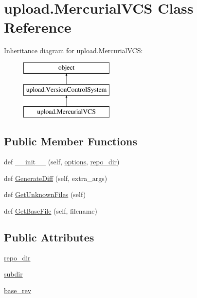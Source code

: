 \hypertarget{classupload_1_1_mercurial_v_c_s}{}\section{upload.\+Mercurial\+V\+C\+S Class Reference}
\label{classupload_1_1_mercurial_v_c_s}
Inheritance diagram for upload.\+Mercurial\+V\+C\+S\+:\begin{figure}[H]
\begin{center}
\leavevmode
\includegraphics[height=3.000000cm]{classupload_1_1_mercurial_v_c_s}
\end{center}
\end{figure}
\subsection*{Public Member Functions}
\begin{DoxyCompactItemize}
\item 
def \hyperlink{classupload_1_1_mercurial_v_c_s_a33890f442dedbb7d9fd45c08b5baed56}{\+\_\+\+\_\+init\+\_\+\+\_\+} (self, \hyperlink{classupload_1_1_version_control_system_a4d57d043bc408887b94269fe4cea9556}{options}, \hyperlink{classupload_1_1_mercurial_v_c_s_a219c1e0ab9ce864e3231913762ea489b}{repo\+\_\+dir})
\item 
def \hyperlink{classupload_1_1_mercurial_v_c_s_a6c05746012d8cd435c94ace1465671ef}{Generate\+Diff} (self, extra\+\_\+args)
\item 
def \hyperlink{classupload_1_1_mercurial_v_c_s_a6190899fb86cd09ad84cc5d4b0ebd2f3}{Get\+Unknown\+Files} (self)
\item 
def \hyperlink{classupload_1_1_mercurial_v_c_s_a0cdc0cbe6ac4daab82f5f01e6ae2e670}{Get\+Base\+File} (self, filename)
\end{DoxyCompactItemize}
\subsection*{Public Attributes}
\begin{DoxyCompactItemize}
\item 
\hyperlink{classupload_1_1_mercurial_v_c_s_a219c1e0ab9ce864e3231913762ea489b}{repo\+\_\+dir}
\item 
\hyperlink{classupload_1_1_mercurial_v_c_s_a0dad32e621f5523e3430d867184f0b42}{subdir}
\item 
\hyperlink{classupload_1_1_mercurial_v_c_s_a41faae7820d5a015f4a42476e5e4ab8c}{base\+\_\+rev}
\end{DoxyCompactItemize}


